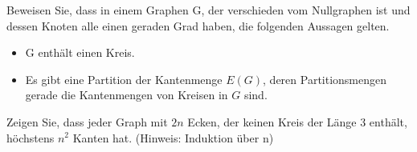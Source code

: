 \documentclass[10pt, a4paper]{exam}
\begin{document}
\begin{questions}

    \question Beweisen Sie, dass in einem Graphen G, der verschieden vom Nullgraphen ist und dessen Knoten alle einen geraden Grad haben, die folgenden Aussagen gelten.
    \begin{itemize}
        \item G enthält einen Kreis.
        \item Es gibt eine Partition der Kantenmenge $E(G)$, deren Partitionsmengen gerade die Kantenmengen von Kreisen in $G$ sind.
    \end{itemize}
    \begin{solution}
    \end{solution}

    \question Zeigen Sie, dass jeder Graph mit $2n$ Ecken, der keinen Kreis der Länge 3 enthält, höchstens $n^2$ Kanten hat. (Hinweis: Induktion über n)
    \begin{solution}
    \end{solution}

\end{questions}
\end{document}
